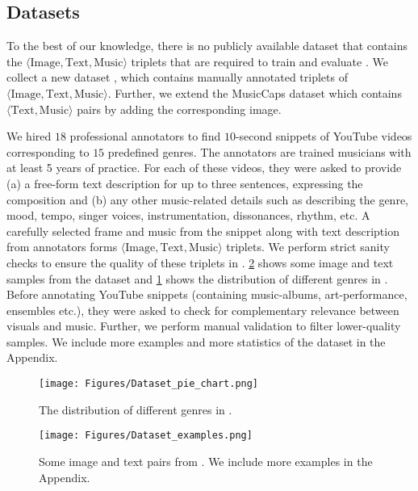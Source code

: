 \subsection{Datasets}
\label{datasets}

To the best of our knowledge, there is no publicly available dataset that contains the $\langle \text{Image}, \text{Text}, \text{Music} \rangle$ triplets that are required to train and evaluate \modelname. We collect a new dataset \ourdataset, which contains \ourdatasetsize manually annotated triplets of $\langle \text{Image}, \text{Text}, \text{Music} \rangle$. Further, we extend the MusicCaps \cite{musiclm} dataset which contains $\langle \text{Text}, \text{Music} \rangle$ pairs by adding the corresponding image. 

\noindent{\textbf{\ourdataset:}}
We hired $18$ professional annotators to find $10$-second snippets of YouTube videos corresponding to $15$ predefined genres. The annotators are trained musicians with at least 5 years of practice. For each of these videos, they were asked to provide (a) a free-form text description for up to three sentences, expressing the composition and (b) any other music-related details such as describing the genre, mood, tempo, singer voices, instrumentation, dissonances, rhythm, etc. A carefully selected frame and music from the snippet along with text description from annotators forms $\langle \text{Image}, \text{Text}, \text{Music} \rangle$ triplets. We perform strict sanity checks to ensure the quality of these triplets in \ourdataset. \cref{fig:dataset_main_paper} shows some image and text samples from the dataset and \cref{fig:dataset_pie_chart} shows the distribution of different genres in \ourdataset.  Before annotating YouTube snippets (containing music-albums, art-performance, ensembles etc.), they were asked to check for complementary relevance between visuals and music. Further, we perform manual validation to filter lower-quality samples. We include more examples and more statistics of the dataset in the Appendix.

\begin{figure}
    \centering
    \texttt{[image: Figures/Dataset\_pie\_chart.png]}
    \caption{The distribution of different genres in \ourdataset.}
    \label{fig:dataset_pie_chart}
\end{figure}
\begin{figure}
    \centering
    \texttt{[image: Figures/Dataset\_examples.png]}
    \caption{Some image and text pairs from \ourdataset. We include more examples in the Appendix.}
    \label{fig:dataset_main_paper}
\end{figure}


